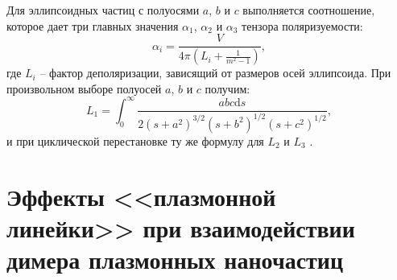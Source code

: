 Для эллипсоидных частиц с полуосями $ a $, $ b $ и $ c $ выполняется соотношение, которое дает три главных значения $ \alpha_1 $, $ \alpha_2 $ и $ \alpha_3 $ тензора поляризуемости:
\begin{equation}
\alpha _i = \frac{V}{4 \pi (L_i + \frac{1}{m^2 - 1})},
\label{eq:polarizabilityEllip}
\end{equation}
где $ L_i $ -- фактор деполяризации, зависящий от размеров осей эллипсоида. При произвольном выборе полуосей $ a $, $ b $ и $ c $ получим:
\begin{equation}
L_1 = \int_0^\infty \frac{a b c \mathrm{d} s}{2 (s + a^2)^{3/2} (s + b^2)^{1/2} (s + c^2)^{1/2}},
\label{eq:Lfactor}
\end{equation}
и при циклической перестановке ту же формулу для $ L_2 $ и $ L_3 $ \cite{LPP_Hulst}.

\section{Эффекты <<плазмонной линейки>> при взаимодействии димера плазмонных наночастиц}


